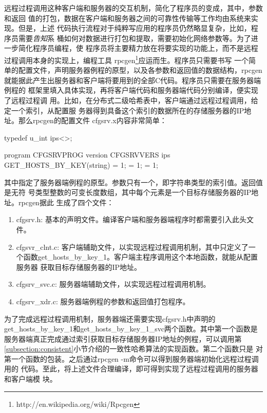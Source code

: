 远程过程调用这种客户端和服务器的交互机制，简化了程序员的变成，其中，参数和返回
值的打包，数据在客户端和服务器之间的可靠性传输等工作均由系统来实现。但是，上述
代码执行流程对于纯粹写应用的程序员仍然略显复杂，比如，程序员需要\emph{告知}系
桶如何对数据进行打包和提取，需要初始化网络参数等。为了进一步简化程序员编程，使
程序员将主要精力放在将要实现的功能上，而不是远程过程调用本身的实现上，编程工具
rpcgen\footnote{http://en.wikipedia.org/wiki/Rpcgen}应运而生。程序员只需要书写
一个简单的配置文件，声明服务器例程的原型，以及各参数和返回值的数据结构，rpcgen
就能据此产生出服务器和客户端将要用到的全部C代码。程序员只需要在服务器端例程的
框架里填入具体实现，再将客户端代码和服务器端代码分别编译，便实现了远程过程调
用。比如，在分布式二级哈希表中，客户端通过远程过程调用，给定一个索引，从配置服
务器得到具备这个索引的数据所在的存储服务器的IP地址。那么rpcgen的配置文件
cfgsrv.x内容非常简单：
\begin{code}
typedef u_int ips<>;

program CFGSRVPROG {
  version CFGSRVVERS {
    ips GET_HOSTS_BY_KEY(string) = 1;
  } = 1;
} = 1;
\end{code}
其中指定了服务器端例程的原型。参数只有一个，即字符串类型的索引值。返回值是无符
号类型整数的可变长度数组，其中每个元素是一个目标存储服务器的IP地址。rpcgen据此
生成了四个文件：
\begin{enumerate}
  \item cfgsrv.h: 基本的声明文件。编译客户端和服务器端程序时都需要引入此头文
  件。
  \item cfgsvr\_clnt.c: 客户端辅助文件，以实现远程过程调用机制，其中只定义了一
  个函数get\_hosts\_by\_key\_1。客户端主程序调用这个本地函数，就能从配置服务器
  获取目标存储服务器的IP地址。
  \item cfgsrv\_svc.c: 服务器端辅助文件，以实现远程过程调用机制。
  \item cfgsrv\_xdr.c: 服务器端例程的参数和返回值打包程序。
\end{enumerate}
为了完成远程过程调用机制，服务器端还需要实现cfgsrv.h中声明的
get\_hosts\_by\_key\_1和get\_hosts\_by\_key\_1\_svc两个函数。其中第一个函数是
服务器端真正完成通过索引获取目标存储服务器IP地址的例程，可以调用第
\ref{subsection:consistent}小节介绍的一致性哈希算法的实现函数。第二个函数只是
对第一个函数的包装。之后通过rpcgen -m命令可以得到服务器端初始化远程过程调用的
代码。至此，将上述文件合理编译，即可得到实现了远程过程调用的服务器和客户端模
块。

